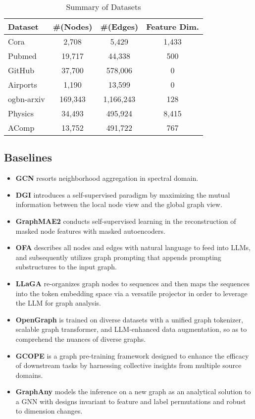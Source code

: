 \begin{table}[t]
    \centering
    \caption{Summary of Datasets}
    \vspace{-0.05in}
    \label{tab:datasets}
    \begin{tabular}{l ccc}
    \toprule
    Dataset  & \#(Nodes) & \#(Edges) & 
    Feature Dim. \\
    \midrule
    Cora &   2,708 & 5,429 & 1,433 \\
    Pubmed & 19,717 & 44,338 & 500\\
    GitHub & 37,700 & 578,006& 0 \\
    Airports& 1,190 & 13,599 & 0\\
    ogbn-arxiv& 169,343   & 1,166,243    & 128  \\
    Physics   &  34,493  & 495,924  &  8,415 \\
    AComp& 13,752    & 491,722    & 767 \\
    \bottomrule
    \end{tabular}
     \vspace{-0.1in}
    \end{table}

\vspace{-0.15in}
\subsection{Baselines}
\begin{itemize}
\item \textbf{GCN} \cite{iclr17gcn}  resorts  neighborhood aggregation in spectral domain.
\item \textbf{DGI} \cite{iclr19dgi} introduces a self-supervised paradigm by maximizing the mutual information between the local node view and the global graph view.
\item  \textbf{GraphMAE2} \cite{www23graphmae2} conducts self-supervised learning in the reconstruction of masked node features with masked autoencoders.
\item  \textbf{OFA} \cite{iclr24ofa} describes all nodes and edges with natural language to feed into  LLMs, and  subsequently utilizes  graph prompting  that appends prompting substructures to the input graph.
\item  \textbf{LLaGA} \cite{icml24llaga} re-organizes graph nodes to  sequences and then maps the sequences into the token embedding space via a versatile projector in order to leverage the LLM for graph analysis.
\item  \textbf{OpenGraph} \cite{xia2024opengraph} is  trained on diverse datasets with a unified graph tokenizer, scalable graph transformer, and LLM-enhanced data augmentation, so as to  comprehend the nuances of diverse graphs.
\item  \textbf{GCOPE} \cite{kdd24gcope} is a graph pre-training framework designed to enhance the efficacy of downstream tasks by harnessing collective insights from multiple source domains. 
\item \textbf{GraphAny} \cite{zhao2024graphany} models the inference on a new graph as an analytical solution to a GNN with designs invariant to feature and label permutations and robust to dimension changes.
\end{itemize}


